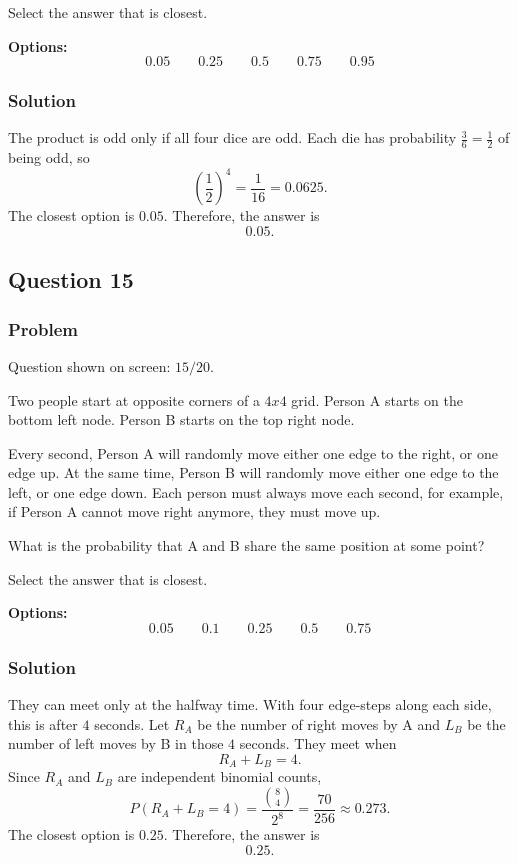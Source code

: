 \documentclass[12pt]{article}
\begin{document}
Select the answer that is closest.

\noindent\textbf{Options:}
\[
\boxed{0.05}
\qquad
\boxed{0.25}
\qquad
\boxed{0.5}
\qquad
\boxed{0.75}
\qquad
\boxed{0.95}
\]

\subsubsection{Solution}
The product is odd only if all four dice are odd. Each die has probability \(\frac{3}{6}=\frac{1}{2}\) of being odd, so
\[
\left(\frac{1}{2}\right)^4=\frac{1}{16}=0.0625.
\]
The closest option is \(0.05\). Therefore, the answer is
\[
\boxed{0.05}.
\]

\subsection{Question 15}
\subsubsection{Problem}
Question shown on screen: \(15/20\).

Two people start at opposite corners of a \(4x4\) grid. Person A starts on the bottom left node. Person B starts on the top right node.

Every second, Person A will randomly move either one edge to the right, or one edge up. At the same time, Person B will randomly move either one edge to the left, or one edge down. Each person must always move each second, for example, if Person A cannot move right anymore, they must move up.

What is the probability that A and B share the same position at some point?

Select the answer that is closest.

\noindent\textbf{Options:}
\[
\boxed{0.05}
\qquad
\boxed{0.1}
\qquad
\boxed{0.25}
\qquad
\boxed{0.5}
\qquad
\boxed{0.75}
\]

\subsubsection{Solution}
They can meet only at the halfway time. With four edge-steps along each side, this is after \(4\) seconds. Let \(R_A\) be the number of right moves by A and \(L_B\) be the number of left moves by B in those \(4\) seconds. They meet when
\[
R_A+L_B=4.
\]
Since \(R_A\) and \(L_B\) are independent binomial counts,
\[
P(R_A+L_B=4)=\frac{\binom{8}{4}}{2^8}
=\frac{70}{256}\approx 0.273.
\]
The closest option is \(0.25\). Therefore, the answer is
\[
\boxed{0.25}.
\]
\end{document}
